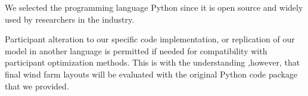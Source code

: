         We selected the programming language Python since it is open source and widely used by researchers in the industry.

        Participant alteration to our specific code implementation, or replication of our model in another language is permitted if needed for compatibility with participant optimization methods.
        This is with the understanding ,however, that final wind farm layouts will be evaluated with the original Python code package that we provided.